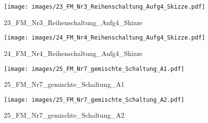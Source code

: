 %
%
\begin{figure}[!hb]%
    \centering
  \texttt{[image: images/23\_FM\_Nr3\_Reihenschaltung\_Aufg4\_Skizze.pdf]}%
  \caption{23_FM_Nr3_Reihenschaltung_Aufg4_Skizze}%
\end{figure}

%
%
\begin{figure}[!hb]%
    \centering
  \texttt{[image: images/24\_FM\_Nr4\_Reihenschaltung\_Aufg4\_Skizze.pdf]}%
  \caption{24_FM_Nr4_Reihenschaltung_Aufg4_Skizze}%
\end{figure}

%
%
\begin{figure}[!hb]%
    \centering
  \texttt{[image: images/25\_FM\_Nr7\_gemischte\_Schaltung\_A1.pdf]}%
  \caption{25_FM_Nr7_gemischte_Schaltung_A1}%
\end{figure}

%
%
\begin{figure}[!hb]%
    \centering
  \texttt{[image: images/25\_FM\_Nr7\_gemischte\_Schaltung\_A2.pdf]}%
  \caption{25_FM_Nr7_gemischte_Schaltung_A2}%
\end{figure}

